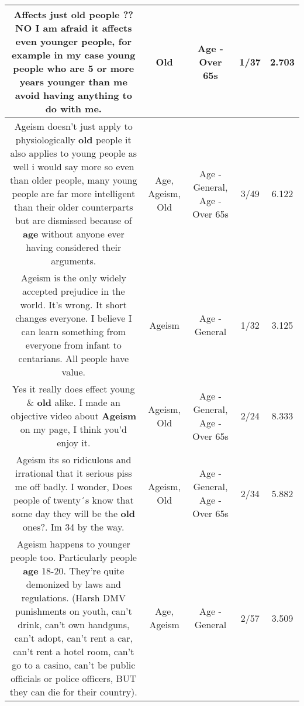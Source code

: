 \documentclass[11pt]{article}
\newlength\mylength
\begin{document}
\begin{center}
\begin{longtable}{|C{.65\mylength}|C{.30\mylength}|C{.12\mylength}|C{.12\mylength}|C{.12\mylength}|}
  \small Affects just \textbf{old} people ?? NO I am afraid it affects even younger people, for example in my case young people who are 5 or more years younger than me avoid having anything to do with me.\normalsize   & Old & Age - Over 65s & 1/37 & 2.703 \\  \hline
  \small Ageism doesn't just apply to physiologically \textbf{old} people it also applies to young people as well i would say more so even than older people, many young people are far more intelligent than their older counterparts but are dismissed because of \textbf{age} without anyone ever having considered their arguments.\normalsize   & Age, Ageism, Old & Age - General, Age - Over 65s & 3/49 & 6.122 \\  \hline
  \small Ageism is the only widely accepted prejudice in the world. It's wrong. It short changes everyone. I believe I can learn something from everyone from infant to centarians. All people have value.\normalsize   & Ageism & Age - General & 1/32 & 3.125 \\  \hline
  \small Yes it really does effect young \& \textbf{old} alike. I made an objective video about \textbf{Ageism} on my page, I think you'd enjoy it.\normalsize   & Ageism, Old & Age - General, Age - Over 65s & 2/24 & 8.333 \\  \hline
  \small Ageism its so ridiculous and irrational that it serious piss me off badly. I wonder, Does people of twenty´s know that some day they will be the \textbf{old} ones?. Im 34 by the way.\normalsize   & Ageism, Old & Age - General, Age - Over 65s & 2/34 & 5.882 \\  \hline
  \small Ageism happens to younger people too. Particularly people \textbf{age} 18-20. They're quite demonized by laws and regulations. (Harsh DMV punishments on youth, can't drink, can't own handguns, can't adopt, can't rent a car, can't rent a hotel room, can't go to a casino, can't be public officials or police officers, BUT they can die for their country).\normalsize   & Age, Ageism & Age - General & 2/57 & 3.509 \\  \hline

\end{longtable}
\end{center}
\end{document}
